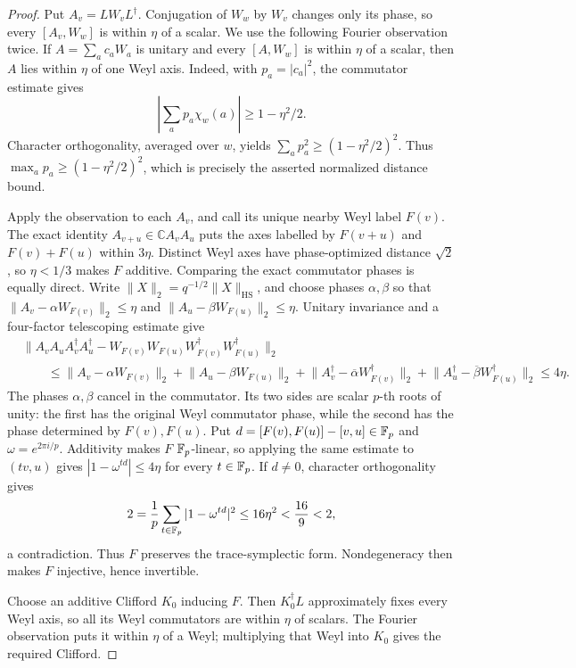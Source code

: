 \begin{proof}
Put \(A_v=LW_vL^\dagger\).  Conjugation of \(W_w\) by \(W_v\) changes
only its phase, so every \([A_v,W_w]\) is within \(\eta\) of a scalar.
We use the following Fourier observation twice.  If
\(A=\sum_a c_aW_a\) is unitary and every \([A,W_w]\) is within \(\eta\)
of a scalar, then \(A\) lies within \(\eta\) of one Weyl axis.  Indeed,
with \(p_a=|c_a|^2\), the commutator estimate gives
\[
 \left|\sum_a p_a\chi_w(a)\right|\geq1-\eta^2/2.
\]
Character orthogonality, averaged over \(w\), yields
\(\sum_ap_a^2\geq(1-\eta^2/2)^2\).  Thus
\(\max_ap_a\geq(1-\eta^2/2)^2\), which is precisely the asserted
normalized distance bound.

Apply the observation to each \(A_v\), and call its unique nearby Weyl
label \(F(v)\).  The exact identity
\(A_{v+u}\in\mathbb C A_vA_u\) puts the axes labelled by \(F(v+u)\) and
\(F(v)+F(u)\) within \(3\eta\).  Distinct Weyl axes have phase-optimized
distance \(\sqrt2\), so \(\eta<1/3\) makes \(F\) additive.  Comparing
the exact commutator phases is equally direct.  Write
\(\lVert X\rVert_2=q^{-1/2}\lVert X\rVert_{\mathrm{HS}}\), and choose phases
\(\alpha,\beta\) so that
\(\lVert A_v-\alpha W_{F(v)}\rVert_2\leq\eta\) and
\(\lVert A_u-\beta W_{F(u)}\rVert_2\leq\eta\).  Unitary invariance and a
four-factor telescoping estimate give
\[
\begin{aligned}
 &\bigl\lVert A_vA_uA_v^\dagger A_u^\dagger
   -W_{F(v)}W_{F(u)}W_{F(v)}^\dagger W_{F(u)}^\dagger\bigr\rVert_2\\
 &\qquad\leq
 \lVert A_v-\alpha W_{F(v)}\rVert_2
 +\lVert A_u-\beta W_{F(u)}\rVert_2
 +\lVert A_v^\dagger-\overline\alpha W_{F(v)}^\dagger\rVert_2
 +\lVert A_u^\dagger-\overline\beta W_{F(u)}^\dagger\rVert_2
 \leq4\eta .
\end{aligned}
\]
The phases \(\alpha,\beta\) cancel in the commutator.  Its two sides are
scalar \(p\)-th roots of unity: the first has the original Weyl commutator
phase, while the second has the phase determined by \(F(v),F(u)\).
Put \(d=[F(v),F(u)]-[v,u]\in\mathbb F_p\) and \(\omega=e^{2\pi i/p}\).
Additivity makes \(F\) \(\mathbb F_p\)-linear, so applying the same estimate to
\((tv,u)\) gives \(|1-\omega^{td}|\leq4\eta\) for every \(t\in\mathbb F_p\).
If \(d\ne0\), character orthogonality gives
\[
 2=\frac1p\sum_{t\in\mathbb F_p}|1-\omega^{td}|^2
 \leq16\eta^2<\frac{16}{9}<2,
\]
a contradiction.  Thus \(F\) preserves the trace-symplectic form.
Nondegeneracy then makes \(F\) injective, hence invertible.

Choose an additive Clifford \(K_0\) inducing \(F\).  Then
\(K_0^\dagger L\) approximately fixes every Weyl axis, so all its Weyl
commutators are within \(\eta\) of scalars.  The Fourier observation puts
it within \(\eta\) of a Weyl; multiplying that Weyl into \(K_0\) gives
the required Clifford.
\end{proof}

